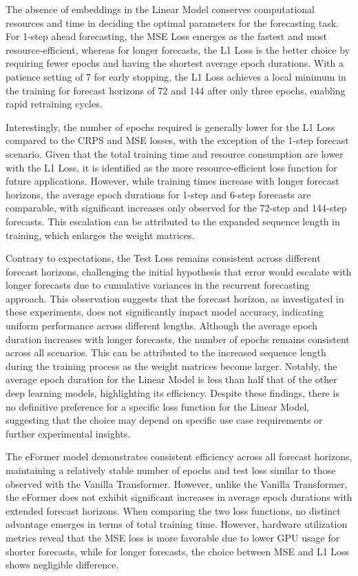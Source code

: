 \documentclass{article}
\begin{document}
The absence of embeddings in the Linear Model conserves computational resources and time in deciding the optimal parameters for the forecasting task. For 1-step ahead forecasting, the MSE Loss emerges as the fastest and most resource-efficient, whereas for longer forecasts, the L1 Loss is the better choice by requiring fewer epochs and having the shortest average epoch durations. With a patience setting of 7 for early stopping, the L1 Loss achieves a local minimum in the training for forecast horizons of 72 and 144 after only three epochs, enabling rapid retraining cycles.

Interestingly, the number of epochs required is generally lower for the L1 Loss compared to the CRPS and MSE losses, with the exception of the 1-step forecast scenario. Given that the total training time and resource consumption are lower with the L1 Loss, it is identified as the more resource-efficient loss function for future applications. However, while training times increase with longer forecast horizons, the average epoch durations for 1-step and 6-step forecasts are comparable, with significant increases only observed for the 72-step and 144-step forecasts. This escalation can be attributed to the expanded sequence length in training, which enlarges the weight matrices.

Contrary to expectations, the Test Loss remains consistent across different forecast horizons, challenging the initial hypothesis that error would escalate with longer forecasts due to cumulative variances in the recurrent forecasting approach. This observation suggests that the forecast horizon, as investigated in these experiments, does not significantly impact model accuracy, indicating uniform performance across different lengths. Although the average epoch duration increases with longer forecasts, the number of epochs remains consistent across all scenarios. This can be attributed to the increased sequence length during the training process as the weight matrices become larger. Notably, the average epoch duration for the Linear Model is less than half that of the other deep learning models, highlighting its efficiency. Despite these findings, there is no definitive preference for a specific loss function for the Linear Model, suggesting that the choice may depend on specific use case requirements or further experimental insights.



The eFormer model demonstrates consistent efficiency across all forecast horizons, maintaining a relatively stable number of epochs and test loss similar to those observed with the Vanilla Transformer. However, unlike the Vanilla Transformer, the eFormer does not exhibit significant increases in average epoch durations with extended forecast horizons. When comparing the two loss functions, no distinct advantage emerges in terms of total training time. However, hardware utilization metrics reveal that the MSE loss is more favorable due to lower GPU usage for shorter forecasts, while for longer forecasts, the choice between MSE and L1 Loss shows negligible difference.
\end{document}
